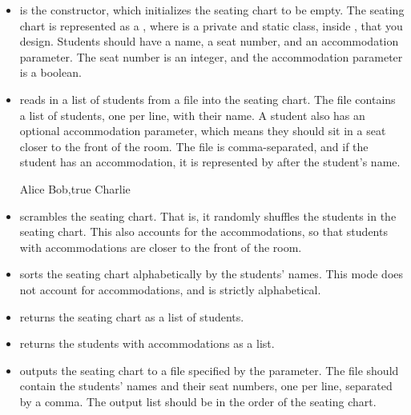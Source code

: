 \begin{itemize}
    \item {} is the constructor, which initializes the seating chart to be empty. The seating chart is represented as a , where  is a private and static class, inside , that you design. Students should have a name, a seat number, and an accommodation parameter. The seat number is an integer, and the accommodation parameter is a boolean.

    \item {} reads in a list of students from a file into the seating chart. The file contains a list of students, one per line, with their name. A student also has an optional accommodation parameter, which means they should sit in a seat closer to the front of the room. The file is comma-separated, and if the student has an accommodation, it is represented by  after the student's name.
    \begin{verbnobox}[\small]
Alice
Bob,true
Charlie
    \end{verbnobox}
    \item {} scrambles the seating chart. That is, it randomly shuffles the students in the seating chart. This also accounts for the accommodations, so that students with accommodations are closer to the front of the room.
    \item {} sorts the seating chart alphabetically by the students' names. This mode does not account for accommodations, and is strictly alphabetical.
    \item {} returns the seating chart as a list of students.
    \item {} returns the students with accommodations as a list.
    \item {} outputs the seating chart to a file specified by the parameter. The file should contain the students' names and their seat numbers, one per line, separated by a comma. The output list should be in the order of the seating chart.
\end{itemize}


